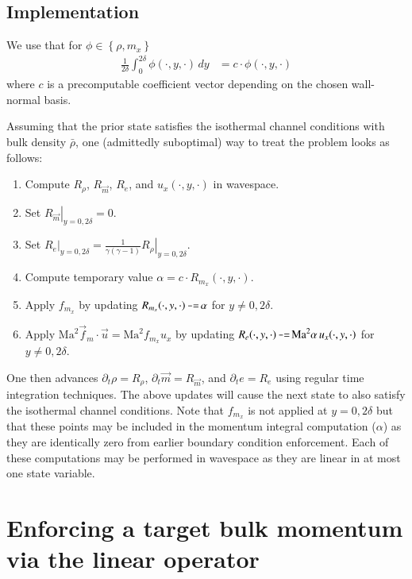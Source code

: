 \documentclass[letterpaper,11pt,nointlimits,reqno]{amsart}
\begin{document}
\subsection{Implementation}

We use that for
$\phi\in\left\{\rho,m_{x}\right\}$
\begin{align}
  \frac{1}{2\delta} \int_{0}^{2\delta} \phi\!\left(\cdot,y,\cdot\right)\,dy
  &=
  c \cdot \phi\!\left(\cdot,y,\cdot\right)
\end{align}
where $c$ is a precomputable coefficient vector depending on the chosen
wall-normal basis.

Assuming that the prior state satisfies the isothermal channel conditions with
bulk density $\bar{\rho}$, one (admittedly suboptimal) way to treat the
problem looks as follows:
\begin{enumerate}
  \item Compute $R_{\rho}$, $R_{\vec{m}}$, $R_{e}$,
        and $u_{x}\!\left(\cdot,y,\cdot\right)$ in wavespace.
  \item Set $\left.R_{\vec{m}}\right|_{y=0,2\delta} = 0$.
  \item Set $\left.R_{e}\right|_{y=0,2\delta} =
        \frac{1}{\gamma\left(\gamma-1\right)}
        \left.R_{\rho}\right|_{y=0,2\delta}$.
  \item Compute temporary value $\alpha =
        c \cdot R_{m_{x}}\!\left(\cdot,y,\cdot\right)$.
  \item Apply $f_{m_x}$ by updating
        $R_{m_x}\!\left(\cdot,y,\cdot\right) \verb!-=!\, \alpha$
        for $y\neq0,2\delta$.
  \item Apply $\mbox{Ma}^{2}\vec{f}_{m}\cdot\vec{u} = \mbox{Ma}^{2} f_{m_x}
        u_x$ by updating $R_{e}\!\left(\cdot,y,\cdot\right) \verb!-=!\,
        \mbox{Ma}^{2} \alpha \, u_{x}\!\left(\cdot,y,\cdot\right)$ for
        $y\neq0,2\delta$.
\end{enumerate}
One then advances $\partial_{t}\rho = R_{\rho}$, $\partial_{t} \vec{m} =
R_{\vec{m}}$, and $\partial_{t} e = R_{e}$ using regular time integration
techniques.  The above updates will cause the next state to also satisfy the
isothermal channel conditions.  Note that $f_{m_x}$ is not applied at
$y=0,2\delta$ but that these points may be included in the momentum integral
computation ($\alpha$) as they are identically zero from earlier boundary
condition enforcement.  Each of these computations may be performed in
wavespace as they are linear in at most one state variable.


\section{Enforcing a target bulk momentum via the linear operator}
\end{document}
